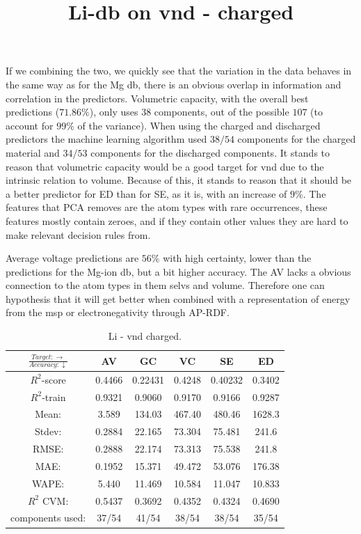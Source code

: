 If we combining the two, we quickly see that the variation in the data behaves in the same way as for the Mg db, there is an obvious overlap in information and correlation in the predictors. Volumetric capacity, with the overall best predictions ($71.86\%$), only uses $38$ components, out of the possible $107$ (to account for $99\%$ of the variance). When using the charged and discharged predictors the machine learning algorithm used $38/54$ components for the charged material and $34/53$ components for the discharged components. It stands to reason that volumetric capacity would be a good target for vnd due to the intrinsic relation to volume. Because of this, it stands to reason that it should be a better predictor for ED than for SE, as it is, with an increase of $9\%$. The features that PCA removes are the atom types with rare occurrences, these features mostly contain zeroes, and if they contain other values they are hard to make relevant decision rules from.  

Average voltage predictions are $56\%$ with high certainty, lower than the predictions for the Mg-ion db, but a bit higher accuracy. The AV lacks a obvious connection to the atom types in them selvs and volume. Therefore one can hypothesis that it will get better when combined with a representation of energy from the msp or electronegativity through AP-RDF.



\begin{table}[h]
\normalsize
\title{Li-db on vnd - charged}
\centering
\caption{Li - vnd charged.}
\begin{tabular}{|c|c|c|c|c|c|}
	\hline 
	$\frac{Target: \rightarrow}{Accuracy:\downarrow} $ & AV & GC & VC & SE & ED 
	 \\ 
	\hline
	$R^2$-score 	& 0.4466 & 0.22431 & 0.4248 	&  0.40232 &  0.3402\\ 
	\hline 
	$R^2$-train 	& 0.9321 & 0.9060 	& 0.9170 	& 0.9166 	& 0.9287 \\ 
	\hline
	Mean: 		&3.589	&134.03	&467.40	&480.46	&1628.3	\\
	\hline 
	Stdev:		&0.2884	&22.165	&73.304	&75.481	&241.6	\\
	\hline
	RMSE: 		& 0.2888 & 22.174	& 73.313 	& 75.538	 & 241.8 \\ 
	\hline 
	MAE: 		& 0.1952 & 15.371	 & 49.472	 & 53.076	 & 176.38 \\ 
	\hline
	WAPE: 		& 5.440 	&  11.469 	& 10.584  	& 11.047 	&10.833 \\
	\hline
	$R^2$ CVM: 	& 0.5437 & 0.3692 	& 0.4352  	& 0.4324 	&0.4690 \\
	\hline
	components used: & 37/54 & 41/54 & 38/54  & 38/54 &35/54 \\
	\hline
\end{tabular}
\label{tab:Li-vnd-i}
\end{table}

